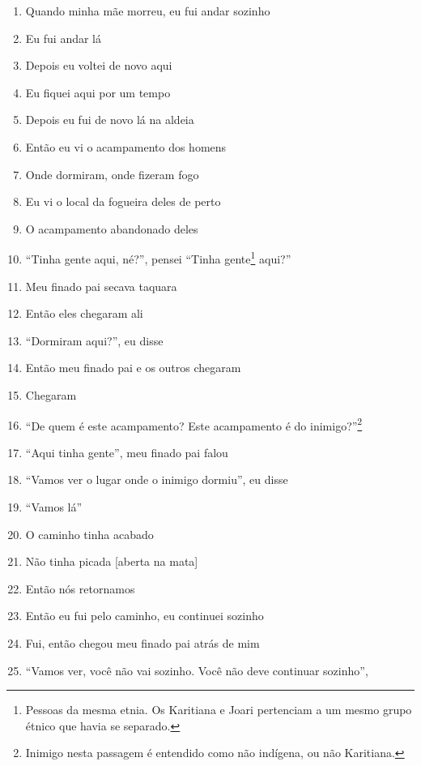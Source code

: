 \begin{enumerate}
 \item Quando minha mãe morreu, eu fui andar sozinho
 \item Eu fui andar lá
 \item Depois eu voltei de novo aqui
 \item Eu fiquei aqui por um tempo
 \begin{center}\end{center}
 \item Depois eu fui de novo lá na aldeia
 \item Então eu vi o acampamento dos homens
 \item Onde dormiram, onde fizeram fogo
 \item Eu vi o local da fogueira deles de perto
 \item O acampamento abandonado deles
 \item ``Tinha gente aqui, né?'', pensei ``Tinha gente\footnote{Pessoas da
   mesma etnia.  Os Karitiana e Joari pertenciam a um mesmo grupo étnico
   que havia se separado.} aqui?''
 \begin{center}\end{center}
 \item Meu finado pai secava taquara
 \item Então eles chegaram ali
 \item ``Dormiram aqui?'', eu disse
 \item Então meu finado pai e os outros chegaram
 \item Chegaram
 \item ``De quem é este acampamento? Este acampamento é do inimigo?''\footnote{Inimigo
   nesta passagem é entendido como não indígena, ou não Karitiana.}
 \item ``Aqui tinha gente'', meu finado pai falou
 \item ``Vamos ver o lugar onde o inimigo dormiu'', eu disse
 \item ``Vamos lá''
 \begin{center}\end{center}
 \item O caminho tinha acabado
 \item Não tinha picada {[}aberta na mata{]}
 \item Então nós retornamos
 \item Então eu fui pelo caminho, eu continuei sozinho
 \item Fui, então chegou meu finado pai atrás de mim
 \item ``Vamos ver, você não vai sozinho. Você não deve continuar sozinho'',

\end{enumerate}
